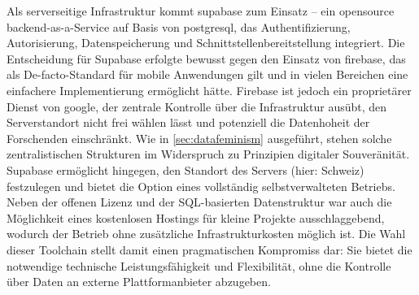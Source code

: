 Als serverseitige Infrastruktur kommt \gls{supabase} zum Einsatz -- ein \gls{opensource} \gls{backend}-as-a-Service auf Basis von \gls{postgresql}, das Authentifizierung, Autorisierung, Datenspeicherung und Schnittstellenbereitstellung integriert. Die Entscheidung für Supabase erfolgte bewusst gegen den Einsatz von \gls{firebase}, das als De-facto-Standard für mobile Anwendungen gilt und in vielen Bereichen eine einfachere Implementierung ermöglicht hätte. Firebase ist jedoch ein proprietärer Dienst von \gls{google}, der zentrale Kontrolle über die Infrastruktur ausübt, den Serverstandort nicht frei wählen lässt und potenziell die Datenhoheit der Forschenden einschränkt. Wie in \cref{sec:datafeminism} ausgeführt, stehen solche zentralistischen Strukturen im Widerspruch zu Prinzipien digitaler Souveränität. Supabase ermöglicht hingegen, den Standort des Servers (hier: Schweiz) festzulegen und bietet die Option eines vollständig selbstverwalteten Betriebs. Neben der offenen Lizenz und der SQL-basierten Datenstruktur war auch die Möglichkeit eines kostenlosen Hostings für kleine Projekte ausschlaggebend, wodurch der Betrieb ohne zusätzliche Infrastrukturkosten möglich ist. Die Wahl dieser Toolchain stellt damit einen pragmatischen Kompromiss dar: Sie bietet die notwendige technische Leistungsfähigkeit und Flexibilität, ohne die Kontrolle über Daten an externe Plattformanbieter abzugeben.

